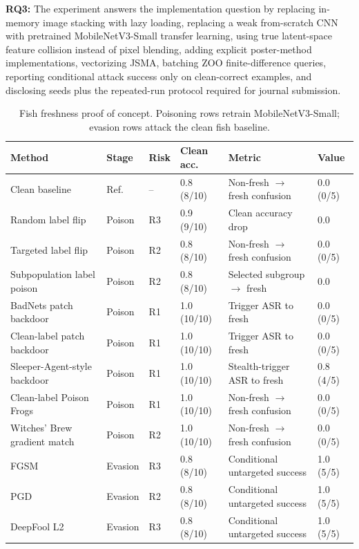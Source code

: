 \documentclass[conference]{IEEEtran}
\begin{document}
\textbf{RQ3:} The experiment answers the implementation question by replacing in-memory image stacking with lazy loading, replacing a weak from-scratch CNN with pretrained MobileNetV3-Small transfer learning, using true latent-space feature collision instead of pixel blending, adding explicit poster-method implementations, vectorizing JSMA, batching ZOO finite-difference queries, reporting conditional attack success only on clean-correct examples, and disclosing seeds plus the repeated-run protocol required for journal submission.


\begin{table}[t]
\centering
\caption{Fish freshness proof of concept. Poisoning rows retrain MobileNetV3-Small; evasion rows attack the clean fish baseline. }
\label{tab:fishresults}
\small
\begin{tabular}{p{}p{}p{}p{}p{}p{}}
\toprule
Method & Stage & Risk & Clean acc. & Metric & Value \\
\midrule
Clean baseline & Ref. & -- & 0.8 (8/10) & Non-fresh \(\rightarrow\) fresh confusion & 0.0 (0/5) \\
Random label flip & Poison & R3 & 0.9 (9/10) & Clean accuracy drop & 0.0 \\
Targeted label flip & Poison & R2 & 0.8 (8/10) & Non-fresh \(\rightarrow\) fresh confusion & 0.0 (0/5) \\
Subpopulation label poison & Poison & R2 & 0.8 (8/10) & Selected subgroup \(\rightarrow\) fresh & 0.0 \\
BadNets patch backdoor & Poison & R1 & 1.0 (10/10) & Trigger ASR to fresh & 0.0 (0/5) \\
Clean-label patch backdoor & Poison & R1 & 1.0 (10/10) & Trigger ASR to fresh & 0.0 (0/5) \\
Sleeper-Agent-style backdoor & Poison & R1 & 1.0 (10/10) & Stealth-trigger ASR to fresh & 0.8 (4/5) \\
Clean-label Poison Frogs & Poison & R1 & 1.0 (10/10) & Non-fresh \(\rightarrow\) fresh confusion & 0.0 (0/5) \\
Witches' Brew gradient match & Poison & R2 & 1.0 (10/10) & Non-fresh \(\rightarrow\) fresh confusion & 0.0 (0/5) \\
FGSM & Evasion & R3 & 0.8 (8/10) & Conditional untargeted success & 1.0 (5/5) \\
PGD & Evasion & R2 & 0.8 (8/10) & Conditional untargeted success & 1.0 (5/5) \\
DeepFool L2 & Evasion & R3 & 0.8 (8/10) & Conditional untargeted success & 1.0 (5/5) \\

\end{tabular}
\end{table}
\end{document}
